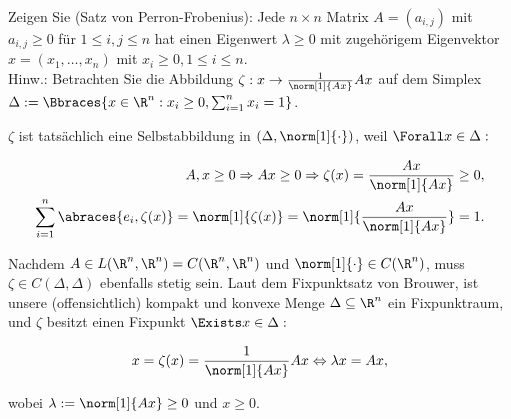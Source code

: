 \begin{exercise}

Zeigen Sie (Satz von Perron-Frobenius): Jede $n\times n$ Matrix $A = (a_{i,j})$ mit $a_{i,j} \geq 0$ für $1 \leq i, j \leq n$ hat einen Eigenwert $\lambda \geq 0$ mit zugehörigem Eigenvektor $x = (x_1,\dots,x_n)$ mit $x_i \geq 0, 1 \leq i \leq n$. \\

Hinw.: Betrachten Sie die Abbildung $\zeta: x \to \frac{1}{\norm[1]{Ax}} Ax$ auf dem Simplex $\Delta := \Bbraces{x \in \R^n: x_i \geq 0, \sum_{i=1}^n x_i = 1}$.

\end{exercise}

\begin{solution}

$\zeta$ ist tatsächlich eine Selbstabbildung in $(\Delta, \norm[1]{\cdot})$, weil $\Forall x \in \Delta:$

\begin{align*}
  A, x \geq 0
  \Rightarrow
  Ax \geq 0
  \Rightarrow
  \zeta(x) = \frac{Ax}{\norm[1]{Ax}} \geq 0, \\
  \sum_{i=1}^n \abraces{e_i, \zeta(x)}
  = \norm[1]{\zeta(x)}
  = \norm[1]{\frac{Ax}{\norm[1]{Ax}}}
  = 1.
\end{align*}

Nachdem $A \in L(\R^n, \R^n) = C(\R^n, \R^n)$ und $\norm[1]{\cdot} \in C(\R^n)$, muss $\zeta \in C(\Delta, \Delta)$ ebenfalls stetig sein. Laut dem Fixpunktsatz von Brouwer, ist unsere (offensichtlich) kompakt und konvexe Menge $\Delta \subseteq \R^n$ ein Fixpunktraum, und $\zeta$ besitzt einen Fixpunkt $\Exists x \in \Delta:$

\begin{equation*}
  x = \zeta(x) = \frac{1}{\norm[1]{Ax}} Ax
  \Leftrightarrow
  \lambda x = Ax,
\end{equation*}

wobei $\lambda := \norm[1]{Ax} \geq 0$ und $x \geq 0$.

\end{solution}
